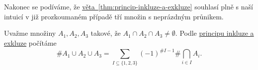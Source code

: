 Nakonec se podíváme, že
\hyperref[thm:princip-inkluze-a-exkluze]{věta~\ref*{thm:princip-inkluze-a-exkluze}}
souhlasí plně s naší intuicí v již prozkoumaném případě tří množin s neprázdným
průnikem.

\begin{example}
 Uvažme množiny $A_1,A_2,A_3$ takové, že $A_1 \cap A_2 \cap A_3 \neq \emptyset$.
 Podle \hyperref[thm:princip-inkluze-a-exkluze]{principu inkluze a exkluze}
 počítáme
 \[
  \# A_1 \cup A_2 \cup A_3 = \sum_{I \subseteq \{1,2,3\}}^{} (-1)^{\#I - 1}\#
  \bigcap_{i \in  I}^{} A_i.
 \]
\end{example}
